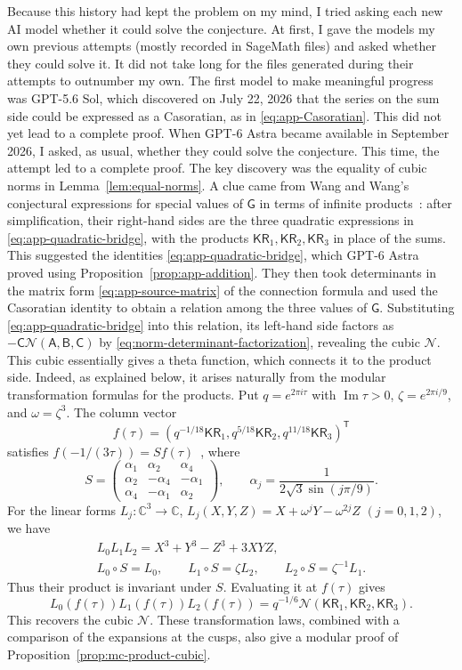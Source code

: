 \documentclass[11pt]{article}
\numberwithin{equation}{section}
\theoremstyle{remark}
\newcommand{\KR}{\mathsf{KR}}
\begin{document}
Because this history had kept the problem on my mind, I tried asking each new AI model whether it could solve the conjecture.
At first, I gave the models my own previous attempts (mostly recorded in SageMath files) and asked whether they could solve it.
It did not take long for the files generated during their attempts to outnumber my own.
The first model to make meaningful progress was GPT-5.6 Sol, which discovered on July 22, 2026 that the series
on the sum side could be expressed as a Casoratian, as in \eqref{eq:app-Casoratian}.
This did not yet lead to a complete proof.
When GPT-6 Astra became available in September 2026, I asked, as usual, whether they could solve the conjecture.
This time, the attempt led to a complete proof.
The key discovery was the equality of cubic norms in Lemma~\ref{lem:equal-norms}.
A clue came from Wang and Wang's conjectural expressions for special values of \(\mathsf G\) in terms of infinite products~\cite[Conjecture 3.7]{WangWang2026}:
after simplification, their right-hand sides are the three quadratic expressions
in \eqref{eq:app-quadratic-bridge}, with the products \(\KR_1,\KR_2,\KR_3\) in place of the sums.
This suggested the identities \eqref{eq:app-quadratic-bridge}, which GPT-6 Astra proved using Proposition~\ref{prop:app-addition}.
They then took determinants in the matrix form \eqref{eq:app-source-matrix} of the connection formula
and used the Casoratian identity to obtain a relation among the three values of \(\mathsf G\).
Substituting \eqref{eq:app-quadratic-bridge} into this relation, its left-hand side factors as
\(-\mathsf C\mathcal N(\mathsf A,\mathsf B,\mathsf C)\) by \eqref{eq:norm-determinant-factorization},
revealing the cubic \(\mathcal N\).
This cubic essentially gives a theta function, which connects it to the product side.
Indeed, as explained below, it arises naturally from the modular transformation formulas for the products.
Put $q=e^{2\pi i\tau}$ with $\operatorname{Im}\tau>0$,
$\zeta=e^{2\pi i/9}$, and $\omega=\zeta^3$. The column vector
\[
 f(\tau)=(q^{-1/18}\KR_1,q^{5/18}\KR_2,q^{11/18}\KR_3)^{\mathsf T}
\]
satisfies $f(-1/(3\tau))=Sf(\tau)$~\cite{Mizuno2025,WangZhang2025}, where
\[
 S=\begin{pmatrix}
 \alpha_1&\alpha_2&\alpha_4\\
 \alpha_2&-\alpha_4&-\alpha_1\\
 \alpha_4&-\alpha_1&\alpha_2
 \end{pmatrix},\qquad
 \alpha_j=\frac{1}{2\sqrt3\sin(j\pi/9)}.
\]
For the linear forms $L_j:\mathbb C^3\to\mathbb C$,
$L_j(X,Y,Z)=X+\omega^jY-\omega^{2j}Z$ $(j=0,1,2)$, we have
\[
 \begin{gathered}
 L_0L_1L_2=X^3+Y^3-Z^3+3XYZ,\\
 L_0\circ S=L_0,\qquad
 L_1\circ S=\zeta L_2,\qquad
 L_2\circ S=\zeta^{-1}L_1.
 \end{gathered}
\]
Thus their product is invariant under $S$. Evaluating it at $f(\tau)$ gives
\[
 L_0(f(\tau))L_1(f(\tau))L_2(f(\tau))
 =q^{-1/6}\mathcal N(\KR_1,\KR_2,\KR_3).
\]
This recovers the cubic $\mathcal N$.
These transformation laws, combined with a comparison of the expansions at the cusps,
also give a modular proof of Proposition~\ref{prop:mc-product-cubic}.
\end{document}
